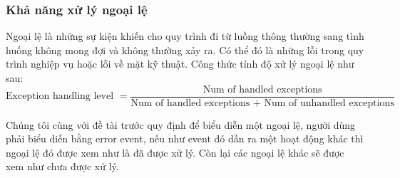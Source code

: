 \subsubsection{Khả năng xử lý ngoại lệ}
Ngoại lệ là những sự kiện khiến cho quy trình đi từ luồng thông thường sang tình huống không mong đợi và không thường xảy ra. Có thể đó là những lỗi trong quy trình nghiệp vụ hoặc lỗi về mặt kỹ thuật. Công thức tính độ xử lý ngoại lệ như sau:
\[ \text{Exception handling level } = \frac{\text{Num of handled exceptions}}{\text{Num of handled exceptions + Num of unhandled exceptions}}\]
\par
Chúng tôi cùng với đề tài trước quy định để biểu
diễn một ngoại lệ, người dùng phải biểu diễn bằng error event, nếu như event đó dẫn ra một hoạt động khác thì ngoại lệ đó được xem như là đã được xử lý. Còn lại các ngoại lệ khác sẽ được xem như chưa được xử lý.